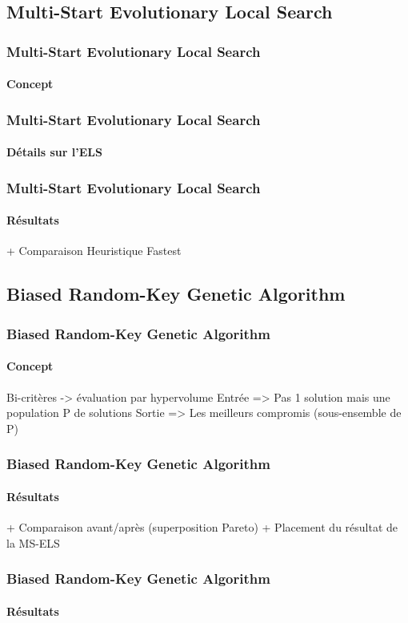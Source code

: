 \subsection{Multi-Start Evolutionary Local Search}
\begin{frame}
	\frametitle{Multi-Start Evolutionary Local Search}
	\framesubtitle{Concept}
\end{frame}
\begin{frame}
	\frametitle{Multi-Start Evolutionary Local Search}
	\framesubtitle{Détails sur l'ELS}
\end{frame}
\begin{frame}
	\frametitle{Multi-Start Evolutionary Local Search}
	\framesubtitle{Résultats}
	+ Comparaison Heuristique Fastest
\end{frame}

\subsection{Biased Random-Key Genetic Algorithm}
\begin{frame}
	\frametitle{Biased Random-Key Genetic Algorithm}
	\framesubtitle{Concept}
	Bi-critères -> évaluation par hypervolume
	Entrée => Pas 1 solution mais une population P de solutions
	Sortie => Les meilleurs compromis (sous-ensemble de P)
\end{frame}
\begin{frame}
	\frametitle{Biased Random-Key Genetic Algorithm}
	\framesubtitle{Résultats}
	+ Comparaison avant/après (superposition Pareto)
	+ Placement du résultat de la MS-ELS
\end{frame}
\begin{frame}
	\frametitle{Biased Random-Key Genetic Algorithm}
	\framesubtitle{Résultats}
	
\end{frame}